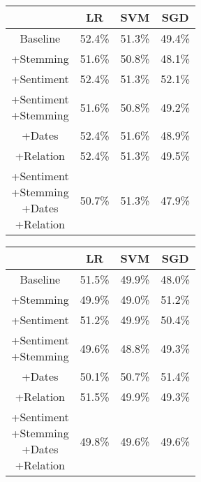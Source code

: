 \documentclass[11pt,a4paper]{article}
\begin{document}
\begin{center}
\begin{tabular}{ |c|c|c|c| }
 \hline
  & LR & SVM & SGD \\
  \hline
  Baseline & 52.4\% & 51.3\% & 49.4\% \\
  \hline
 +Stemming & 51.6\% & 50.8\% & 48.1\% \\
  \hline
 +Sentiment & 52.4\% & 51.3\%  & 52.1\% \\
  \hline
  \shortstack{+Sentiment \\ +Stemming} & 51.6\% & 50.8\% & 49.2\%\\
 \hline
 +Dates & 52.4\% & 51.6\% & 48.9\% \\
  \hline
 +Relation & 52.4\% & 51.3\% & 49.5\% \\
  \hline
  \shortstack{+Sentiment \\ +Stemming \\+Dates \\+Relation} & 50.7\% & 51.3\% & 47.9\% \\
 \hline
\end{tabular}
\end{center}

\newpage
\begin{center}
\begin{tabular}{ |c|c|c|c| }
 \hline
  & LR & SVM & SGD \\
  \hline
  Baseline & 51.5\% & 49.9\% & 48.0\% \\
  \hline
 +Stemming & 49.9\% & 49.0\% & 51.2\% \\
  \hline
 +Sentiment & 51.2\% & 49.9\%  & 50.4\% \\
  \hline
  \shortstack{+Sentiment \\ +Stemming} & 49.6\% & 48.8\% & 49.3\%\\
 \hline
 +Dates & 50.1\% & 50.7\% & 51.4\% \\
  \hline
 +Relation & 51.5\% & 49.9\% & 49.3\% \\
  \hline
  \shortstack{+Sentiment \\ +Stemming \\+Dates \\+Relation} & 49.8\% & 49.6\% & 49.6\% \\
 \hline
\end{tabular}
\end{center}
\end{document}
